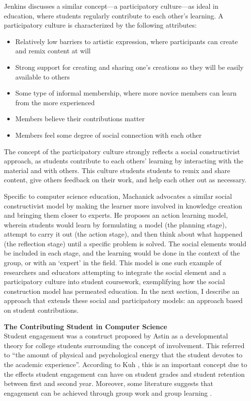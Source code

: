 Jenkins \cite{jenkins2009confronting} discusses a similar concept---a participatory culture---as ideal in education, where students regularly contribute to each other's learning. A participatory culture is characterized by the following attributes:

\begin{itemize}
\item Relatively low barriers to artistic expression, where participants can create and remix content at will
\item Strong support for creating and sharing one’s creations so they will be easily available to others
\item Some type of informal membership, where more novice members can learn from the more experienced
\item Members believe their contributions matter
\item Members feel some degree of social connection with each other
\end{itemize}

The concept of the participatory culture strongly reflects a social constructivist approach, as students contribute to each others' learning by interacting with the material and with others. This culture students students to remix and share content, give others feedback on their work, and help each other out as necessary.

Specific to computer science education, Machanick \cite{machanick2007social} advocates a similar social constructivist model by making the learner more involved in knowledge creation and bringing them closer to experts. He proposes an action learning model, wherein students would learn by formulating a model (the planning stage), attempt to carry it out (the action stage), and then think about what happened (the reflection stage) until a specific problem is solved. The social elements would be included in each stage, and the learning would be done in the context of the group, or with an ‘expert’ in the field. This model is one such example of researchers and educators attempting to integrate the social element and a participatory culture into student coursework, exemplifying how the social construction model has permeated education. In the next section, I describe an approach that extends these social and participatory models: an approach based on student contributions.

\textbf{The Contributing Student in Computer Science} \\
Student engagement was a construct proposed by Astin \cite{astin1984student} as a developmental theory for college students surrounding the concept of involvement. This referred to ``the amount of physical and psychological energy that the student devotes to the academic experience''. According to Kuh \cite{kuh2001assessing}, this is an important concept due to the effects student engagement can have on student grades and student retention between first and second year. Moreover, some literature suggests that engagement can be achieved through group work and group learning \cite{bower2007groupwork}.

